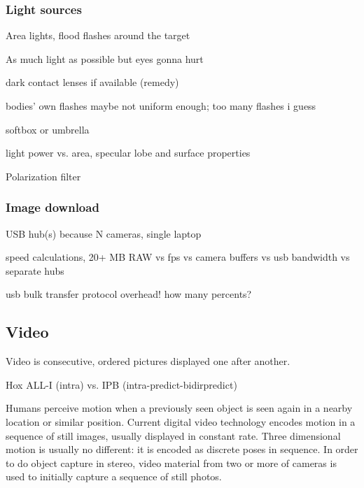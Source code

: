 
\subsubsection{Light sources} %



Area lights, flood flashes around the target

As much light as possible but eyes gonna hurt

dark contact lenses if available (remedy)

bodies' own flashes maybe not uniform enough; too many flashes i guess

softbox or umbrella

light power vs. area, specular lobe and surface properties


Polarization filter


\subsubsection{Image download} %

USB hub(s) because N cameras, single laptop

speed calculations, 20+ MB RAW vs fps vs camera buffers vs usb bandwidth vs separate hubs

usb bulk transfer protocol overhead! how many percents?



\subsection{Video} %

Video is consecutive, ordered pictures displayed one after another.

Hox ALL-I (intra) vs. IPB (intra-predict-bidirpredict)

Humans perceive motion when a previously seen object is seen again in a nearby location or similar position.
Current digital video technology encodes motion in a sequence of still images, usually displayed in constant rate.
Three dimensional motion is usually no different: it is encoded as discrete poses in sequence.
In order to do object capture in stereo, video material from two or more of cameras is used to initially capture a sequence of still photos.

